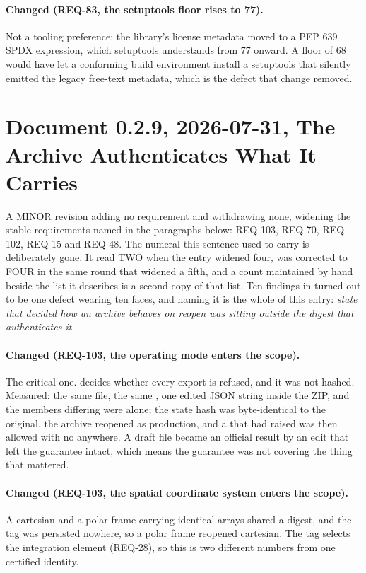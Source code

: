 \paragraph{Changed (REQ-83, the setuptools floor rises to 77).} Not a
tooling preference: the library's license metadata moved to a PEP 639
SPDX expression, which setuptools understands from 77 onward. A floor
of 68 would have let a conforming build environment install a
setuptools that silently emitted the legacy free-text metadata, which
is the defect that change removed.

\section*{Document 0.2.9, 2026-07-31, The Archive Authenticates What It Carries}

A MINOR revision adding no requirement and withdrawing none, widening
the stable requirements named in the paragraphs below: REQ-103, REQ-70,
REQ-102, REQ-15 and REQ-48. The numeral this sentence used to carry is
deliberately gone. It read TWO when the entry widened four, was
corrected to FOUR in the same round that widened a fifth, and a count
maintained by hand beside the list it describes is a second copy of that
list. Ten findings in 
turned out to be one defect wearing ten faces, and naming it is the
whole of this entry: \emph{state that decided how an archive behaves on
reopen was sitting outside the digest that authenticates it}.

\paragraph{Changed (REQ-103, the operating mode enters the scope).} The
critical one.  decides whether every export is
refused, and it was not hashed. Measured: the same file, the same
, one edited JSON string inside the ZIP, and the members
differing were  alone; the state hash was
byte-identical to the original, the archive reopened as production, and
a  that had raised  was then
allowed with no  anywhere. A draft file became an
official result by an edit that left the guarantee intact, which means
the guarantee was not covering the thing that mattered.

\paragraph{Changed (REQ-103, the spatial coordinate system enters the
scope).} A cartesian and a polar frame carrying identical arrays shared
a digest, and the tag was persisted nowhere, so a polar frame reopened
cartesian. The tag selects the integration element (REQ-28), so this is
two different numbers from one certified identity.

